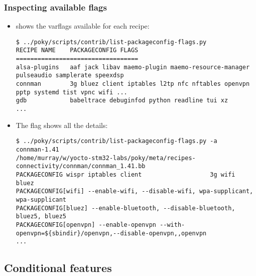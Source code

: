 \begin{frame}[fragile]
  \frametitle{Inspecting available  flags}
  \begin{itemize}
  \item {}
    shows the  varflags available for each recipe:

      \begin{block}{}
        \begin{verbatim}
$ ../poky/scripts/contrib/list-packageconfig-flags.py
RECIPE NAME    PACKAGECONFIG FLAGS
==================================
alsa-plugins   aaf jack libav maemo-plugin maemo-resource-manager pulseaudio samplerate speexdsp
connman        3g bluez client iptables l2tp nfc nftables openvpn pptp systemd tist vpnc wifi ...
gdb            babeltrace debuginfod python readline tui xz
...
        \end{verbatim}
      \end{block}

    \item The  flag shows all the details:
      \begin{block}{}
        \begin{verbatim}
$ ../poky/scripts/contrib/list-packageconfig-flags.py -a
connman-1.41
/home/murray/w/yocto-stm32-labs/poky/meta/recipes-connectivity/connman/connman_1.41.bb
PACKAGECONFIG wispr iptables client                   3g wifi                    bluez
PACKAGECONFIG[wifi] --enable-wifi, --disable-wifi, wpa-supplicant, wpa-supplicant
PACKAGECONFIG[bluez] --enable-bluetooth, --disable-bluetooth, bluez5, bluez5
PACKAGECONFIG[openvpn] --enable-openvpn --with-openvpn=${sbindir}/openvpn,--disable-openvpn,,openvpn
...
        \end{verbatim}
      \end{block}
  \end{itemize}
\end{frame}

\subsection{Conditional features}

